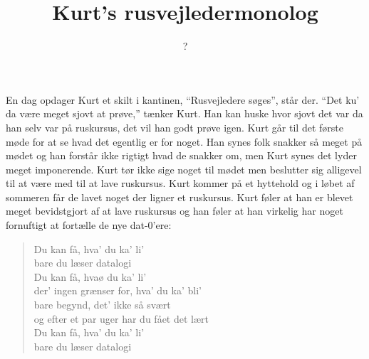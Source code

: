 \documentclass[a4paper,11pt]{article}
\title{Kurt's rusvejledermonolog}
\author{?}
\begin{document}
\maketitle

\begin{sketch}

En dag opdager Kurt et skilt i kantinen, ``Rusvejledere søges'', står der. ``Det ku' da være meget sjovt at prøve,'' tænker Kurt. Han kan huske hvor sjovt det var da han selv var på ruskursus, det vil han godt prøve igen. Kurt går til det første møde for at se hvad det egentlig er for noget. Han synes folk snakker så meget på mødet og han forstår ikke rigtigt hvad de snakker om, men Kurt synes det lyder meget imponerende. Kurt tør ikke sige noget til mødet men beslutter sig alligevel til at være med til at lave ruskursus. Kurt kommer på et hyttehold og i løbet af sommeren får de lavet noget der ligner et ruskursus. Kurt føler at han er blevet meget bevidstgjort af at lave ruskursus og han føler at han virkelig har noget fornuftigt at fortælle de nye dat-0'ere:

\begin{quote}
    Du kan få, hva' du ka' li' \\
    bare du læser datalogi \\
    Du kan få, hvaø du ka' li' \\
    der' ingen grænser for, hva' du ka' bli' \\
    bare begynd, det' ikke så svært \\
    og efter et par uger har du fået det lært \\
    Du kan få, hva' du ka' li' \\
    bare du læser datalogi 
\end{quote}

\end{sketch}
\end{document}
